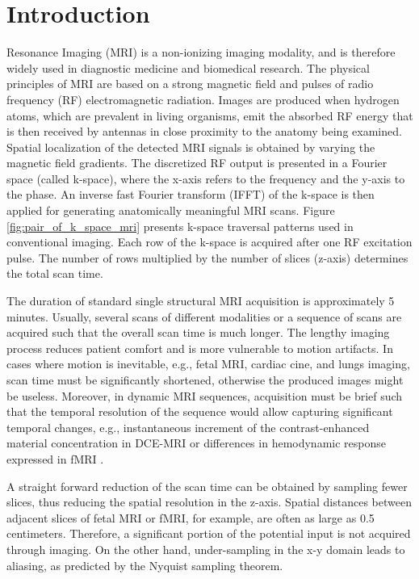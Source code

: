 \documentclass[10pt,journal,compsoc]{IEEEtran}
\begin{document}
\maketitle
\IEEEdisplaynontitleabstractindextext
\IEEEpeerreviewmaketitle


\section{Introduction}
 Resonance Imaging (MRI) is a non-ionizing imaging modality, and is therefore widely used in diagnostic medicine and biomedical research. The physical principles of MRI are based on a strong magnetic field and pulses of radio frequency (RF) electromagnetic radiation. 
Images are produced when hydrogen atoms, which are prevalent in living organisms, emit the absorbed RF energy that is then received by antennas in close proximity to the anatomy being examined. Spatial localization of the detected MRI signals is obtained by varying the magnetic field gradients. The discretized RF output is presented in a Fourier space
(called k-space), where the x-axis refers to the frequency and the y-axis to the phase. An inverse fast Fourier transform (IFFT) of the k-space is then applied for generating anatomically meaningful MRI scans. Figure \ref{fig:pair_of_k_space_mri} presents k-space traversal patterns used in conventional imaging. Each row of the k-space is acquired after one RF excitation pulse. The number of rows multiplied by the number of slices (z-axis) determines the total scan time.

The duration of standard single structural MRI acquisition is approximately 5 minutes. Usually, several scans of different modalities or a sequence of scans are acquired such that the overall scan time is much longer. The lengthy imaging process reduces patient comfort and is more vulnerable to motion artifacts. In cases where motion is inevitable, e.g., fetal MRI, cardiac cine, and lungs imaging, scan time must be significantly shortened, otherwise the produced images might be useless. Moreover, in dynamic MRI sequences, acquisition must be brief such that the temporal resolution of the sequence would allow capturing significant temporal changes, e.g., instantaneous increment of the contrast-enhanced material concentration in DCE-MRI or differences in hemodynamic response expressed in fMRI \cite{moeller2010multiband}.

A straight forward reduction of the scan time can be obtained by sampling fewer slices, thus reducing the spatial resolution in the z-axis. Spatial distances between adjacent slices of fetal MRI or fMRI, for example, are often as large as 0.5 centimeters. Therefore, a significant portion of the potential input is not acquired through imaging. On the other hand, under-sampling in the x-y domain leads to aliasing, as predicted by the Nyquist sampling theorem.
\end{document}
